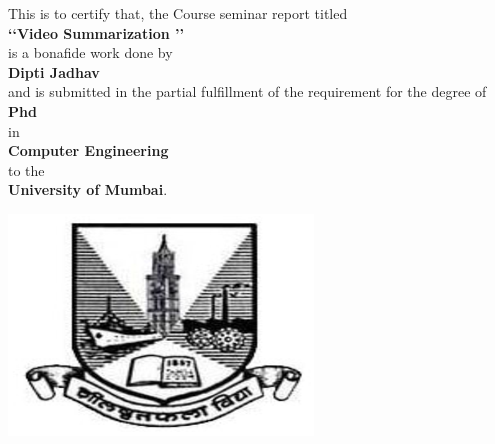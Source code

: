 \begin{center}
\large This is to certify that, the Course seminar report titled
\vspace{0.15in}\\\textbf {\lq\lq Video Summarization \rq\rq} \\
\vspace{0.1in}is a bonafide work done by\vspace{0.15in}
\\\textbf {Dipti Jadhav } \\
\vspace{0.1in} and is submitted in the partial
fulfillment of
the requirement for the degree of \vspace{0.15in} \\\textbf{Phd}\\
in \\\textbf{Computer Engineering} \\to the \\\textbf{University
of Mumbai}.


\includegraphics{university.eps}

 \vspace{0.2in}
%
%
%
\begin{tabular}{ccc}


\end{tabular}
\end{center}
